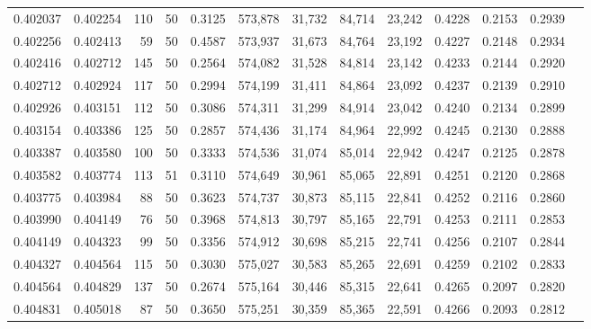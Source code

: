 \begin{tabular}{rrrrrrrrrrrrr}
0.402037 & 0.402254 &   110 &  50 &                                     0.3125 & 573,878 &  31,732 &  84,714 &  23,242 & 0.4228 & 0.2153 & 0.2939 \\
0.402256 & 0.402413 &    59 &  50 &                                     0.4587 & 573,937 &  31,673 &  84,764 &  23,192 & 0.4227 & 0.2148 & 0.2934 \\
0.402416 & 0.402712 &   145 &  50 &                                     0.2564 & 574,082 &  31,528 &  84,814 &  23,142 & 0.4233 & 0.2144 & 0.2920 \\
0.402712 & 0.402924 &   117 &  50 &                                     0.2994 & 574,199 &  31,411 &  84,864 &  23,092 & 0.4237 & 0.2139 & 0.2910 \\
0.402926 & 0.403151 &   112 &  50 &                                     0.3086 & 574,311 &  31,299 &  84,914 &  23,042 & 0.4240 & 0.2134 & 0.2899 \\
0.403154 & 0.403386 &   125 &  50 &                                     0.2857 & 574,436 &  31,174 &  84,964 &  22,992 & 0.4245 & 0.2130 & 0.2888 \\
0.403387 & 0.403580 &   100 &  50 &                                     0.3333 & 574,536 &  31,074 &  85,014 &  22,942 & 0.4247 & 0.2125 & 0.2878 \\
0.403582 & 0.403774 &   113 &  51 &                                     0.3110 & 574,649 &  30,961 &  85,065 &  22,891 & 0.4251 & 0.2120 & 0.2868 \\
0.403775 & 0.403984 &    88 &  50 &                                     0.3623 & 574,737 &  30,873 &  85,115 &  22,841 & 0.4252 & 0.2116 & 0.2860 \\
0.403990 & 0.404149 &    76 &  50 &                                     0.3968 & 574,813 &  30,797 &  85,165 &  22,791 & 0.4253 & 0.2111 & 0.2853 \\
0.404149 & 0.404323 &    99 &  50 &                                     0.3356 & 574,912 &  30,698 &  85,215 &  22,741 & 0.4256 & 0.2107 & 0.2844 \\
0.404327 & 0.404564 &   115 &  50 &                                     0.3030 & 575,027 &  30,583 &  85,265 &  22,691 & 0.4259 & 0.2102 & 0.2833 \\
0.404564 & 0.404829 &   137 &  50 &                                     0.2674 & 575,164 &  30,446 &  85,315 &  22,641 & 0.4265 & 0.2097 & 0.2820 \\
0.404831 & 0.405018 &    87 &  50 &                                     0.3650 & 575,251 &  30,359 &  85,365 &  22,591 & 0.4266 & 0.2093 & 0.2812 \\

\end{tabular}
